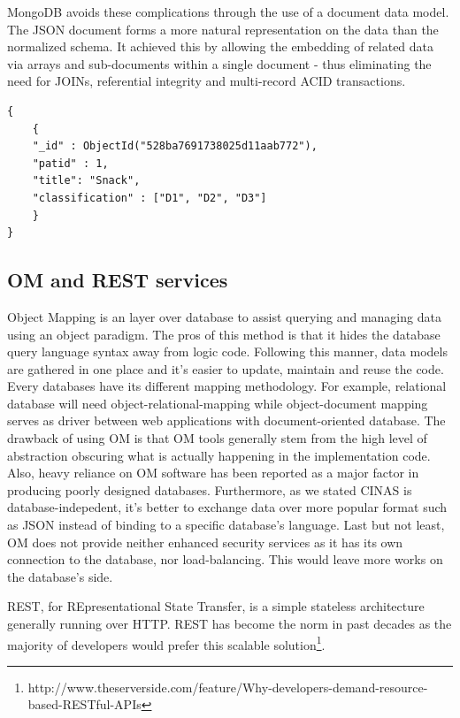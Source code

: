 \documentclass{sig-alternate}
\begin{document}
{MongoDB avoids these complications through the use of a document data model. The JSON document forms a more natural representation on the data than the normalized schema. It achieved this by allowing the embedding of related data via arrays and sub-documents within a single document - thus eliminating the need for JOINs, referential integrity and multi-record ACID transactions.

\begin{lstlisting}[caption=Json Example]
{
	{
	"_id" : ObjectId("528ba7691738025d11aab772"),
	"patid" : 1,
	"title": "Snack",
	"classification" : ["D1", "D2", "D3"]
	}
}
\end{lstlisting}

\subsection{OM and REST services}

Object Mapping is an layer over database to assist querying and managing data using an object paradigm. The pros of this method is that it hides the database query language syntax away from logic code. Following this manner, data models are gathered in one place and it's easier to update, maintain and reuse the code. Every databases have its different mapping methodology. For example, relational database will need object-relational-mapping while object-document mapping serves as driver between web applications with document-oriented database. The drawback of using OM is that OM tools generally stem from the high level of abstraction obscuring what is actually happening in the implementation code. Also, heavy reliance on OM software has been reported as a major factor in producing poorly designed databases. Furthermore, as we stated CINAS is database-indepedent, it's better to exchange data over more popular format such as JSON instead of binding to a specific database's language. Last but not least, OM does not provide neither enhanced security services as it has its own connection to the database, nor load-balancing. This would leave more works on the database's side.

REST, for REpresentational State Transfer, is a simple stateless architecture generally running over HTTP. REST has become the norm in past decades as the majority of developers would prefer this scalable solution\footnote{http://www.theserverside.com/feature/Why-developers-demand-resource-based-RESTful-APIs}.

}
\end{document}
